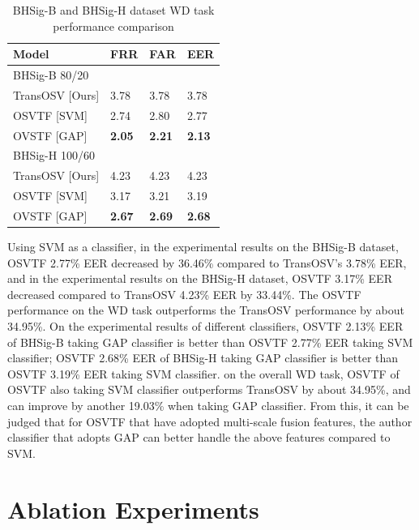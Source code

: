 \begin{table}[htbp]
\caption{BHSig-B and BHSig-H dataset WD task performance comparison}  
\begin{center}
\begin{tabu} to 0.8\textwidth{X[3, l]X[2, l]X[2, l]X[2, l]}  
\toprule
Model & FRR & FAR & EER \\
\midrule
BHSig-B 80/20 \\
TransOSV [Ours] & 3.78 & 3.78 & 3.78 \\
OSVTF [SVM] & 2.74 & 2.80 & 2.77 \\
OVSTF [GAP] & \bf{2.05} & \bf{2.21} & \bf{2.13} \\
\midrule
BHSig-H 100/60 \\
TransOSV [Ours] & 4.23 & 4.23 & 4.23 \\
OSVTF [SVM] & 3.17 & 3.21 & 3.19 \\
OVSTF [GAP] & \bf{2.67} & \bf{2.69} & \bf{2.68} \\
\bottomrule
\end{tabu}
\end{center}
\label{tab:wd}
\end{table}

Using SVM as a classifier, in the experimental results on the BHSig-B dataset, OSVTF 2.77\% EER decreased by 36.46\% compared to TransOSV's 3.78\% EER, and in the experimental results on the BHSig-H dataset, OSVTF 3.17\% EER decreased compared to TransOSV 4.23\% EER by 33.44\%. The OSVTF performance on the WD task outperforms the TransOSV performance by about 34.95\%. On the experimental results of different classifiers, OSVTF 2.13\% EER of BHSig-B taking GAP classifier is better than OSVTF 2.77\% EER taking SVM classifier; OSVTF 2.68\% EER of BHSig-H taking GAP classifier is better than OSVTF 3.19\% EER taking SVM classifier. on the overall WD task, OSVTF of OSVTF also taking SVM classifier outperforms TransOSV by about 34.95\%, and can improve by another 19.03\% when taking GAP classifier. From this, it can be judged that for OSVTF that have adopted multi-scale fusion features, the author classifier that adopts GAP can better handle the above features compared to SVM.


\section{Ablation Experiments}

